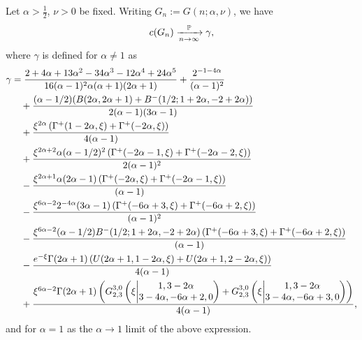 \begin{theorem}\label{thm:clustering_coefficient_hyperbolic}\label{thm:maincc}
Let $\alpha > \frac{1}{2}$, $\nu > 0$ be fixed. Writing $G_n := G(n;\alpha,\nu)$, we have
\[
	c( G_n ) \xrightarrow[n\to\infty]{\mathbb{P}} \gamma,
\]
where $\gamma$ is defined for $\alpha \ne 1$ as
\begin{align*}
	\gamma 
	&=\frac{2 + 4 \alpha + 13 \alpha^2 - 34 \alpha^3 - 12\alpha^4 + 24 \alpha^5}{16(\alpha-1)^2 \alpha (\alpha+1) (2\alpha+1)} 
		+  \frac{2^{-1 - 4 \alpha}}{(\alpha - 1)^2} \\
&\hspace{10pt}+ \frac{(\alpha - 1/2) (B(2 \alpha, 2 \alpha + 1) + B^-(1/2; 1 + 2 \alpha, -2 + 2 \alpha))}{2 (\alpha - 1) (3 \alpha - 1)} \\
%
&\hspace{10pt}+ \frac{\xi^{2\alpha} \left( \Gamma^+( 1 - 2 \alpha, \xi) + \Gamma^+( - 2 \alpha, \xi)\right) }{4(\alpha-1)} \\
%
&\hspace{10pt}+ \frac{\xi^{2\alpha + 2}\alpha (\alpha - 1/2)^2 \left( \Gamma^+(- 2 \alpha - 1, \xi) + \Gamma^+(- 2 \alpha - 2, \xi)\right)}%
{2(\alpha-1)^2} \\
%
&\hspace{10pt}- \frac{\xi^{2\alpha + 1}\alpha (2\alpha - 1) \left( \Gamma^+( - 2\alpha,\xi)+\Gamma^+( - 2 \alpha - 1,\xi) \right)}%
{(\alpha-1)} \\
%
&\hspace{10pt}- \frac{\xi^{6\alpha-2}2^{-4\alpha}(3\alpha - 1)
\left( \Gamma^+( - 6 \alpha + 3, \xi)+\Gamma^+( - 6 \alpha + 2, \xi) \right)}{(\alpha-1)^2}\\
%
&\hspace{10pt}- \frac{\xi^{6\alpha - 2}(\alpha - 1/2) B^-(1/2; 1 + 2 \alpha, -2 + 2 \alpha)%
\left(\Gamma^+( - 6 \alpha + 3, \xi)+\Gamma^+( - 6 \alpha + 2, \xi)\right)}{(\alpha-1)} \\
%
&\hspace{10pt}- \frac{e^{-\xi} \Gamma(2\alpha+1) \left(U(2\alpha+1,1-2\alpha,\xi) + U(2\alpha+1,2-2\alpha,\xi)\right)}{4(\alpha-1)} \\
%
&\hspace{10pt}+ \frac{\xi^{6\alpha - 2} \Gamma(2\alpha+1)\left( \MeijerGnew{3}{0}{2}{3}{1,3-2\alpha}{3-4\alpha,-6\alpha+2,0}{\xi}
 		+ \MeijerGnew{3}{0}{2}{3}{1,3-2\alpha}{3-4\alpha,-6\alpha+3,0}{\xi}\right)}{4(\alpha-1)},
\end{align*}
and for $\alpha = 1$ as the $\alpha\to 1$ limit of the above expression. 

\end{theorem}
